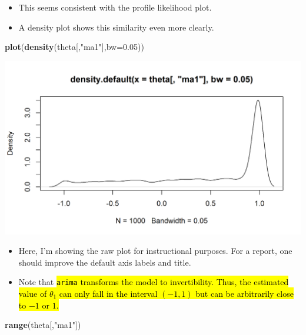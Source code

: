 \documentclass[]{article}
\newenvironment{Shaded}{\begin{snugshade}}{\end{snugshade}}
\newcommand{\KeywordTok}[1]{\textcolor[rgb]{0.13,0.29,0.53}{\textbf{#1}}}
\newcommand{\DataTypeTok}[1]{\textcolor[rgb]{0.13,0.29,0.53}{#1}}
\newcommand{\FloatTok}[1]{\textcolor[rgb]{0.00,0.00,0.81}{#1}}
\newcommand{\StringTok}[1]{\textcolor[rgb]{0.31,0.60,0.02}{#1}}
\newcommand{\NormalTok}[1]{#1}
\begin{document}
\begin{itemize}
\item
  This seems consistent with the profile likelihood plot.
\item
  A density plot shows this similarity even more clearly.
\end{itemize}

\begin{Shaded}
\begin{Highlighting}[]
\KeywordTok{plot}\NormalTok{(}\KeywordTok{density}\NormalTok{(theta[,}\StringTok{"ma1"}\NormalTok{],}\DataTypeTok{bw=}\FloatTok{0.05}\NormalTok{))}
\end{Highlighting}
\end{Shaded}

\begin{center}\includegraphics{figure/intro-density-1} \end{center}

\begin{itemize}
\item
  Here, I'm showing the raw plot for instructional purposes. For a
  report, one should improve the default axis labels and title.
\item
  Note that \hl{\texttt{arima} transforms the model to invertibility. Thus,
  the estimated value of $\theta_1$ can only fall in the interval
  $(-1,1)$ but can be arbitrarily close to $-1$ or $1$.}
\end{itemize}

\begin{Shaded}
\begin{Highlighting}[]
\KeywordTok{range}\NormalTok{(theta[,}\StringTok{"ma1"}\NormalTok{])}
\end{Highlighting}
\end{Shaded}
\end{document}
